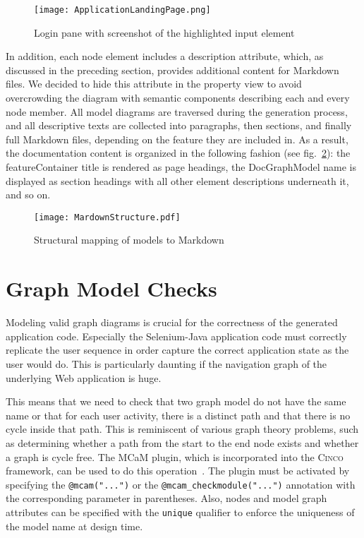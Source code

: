 \begin{figure}[h]
    \centering
    \texttt{[image: ApplicationLandingPage.png]}
    \caption{Login pane with screenshot of the highlighted input element}
    \label{fig:screenshot}
\end{figure}

In addition, each node element includes a description attribute, which, as discussed in the preceding section, provides additional content for Markdown files. We decided to hide this attribute in the property view to avoid overcrowding the diagram with semantic components describing each and every node member. All model diagrams are traversed during the generation process, and all descriptive texts are collected into paragraphs, then sections, and finally full Markdown files, depending on the feature they are included in. As a result, the documentation content is organized in the following fashion (see fig.~\ref{fig:markdown}): the featureContainer title is rendered as page headings, the DocGraphModel name is displayed as section headings with all other element descriptions underneath it, and so on.

\begin{figure}[h]
    \centering
    \texttt{[image: MardownStructure.pdf]}
    \caption{Structural mapping of models to Markdown}
    \label{fig:markdown}
\end{figure}

\section{Graph Model Checks}\label{sec:modCheck}

Modeling valid graph diagrams is crucial for the correctness of the generated application code. Especially the Selenium-Java application code must correctly replicate the user sequence in order capture the correct application state as the user would do. This is particularly daunting if the navigation graph of the underlying Web application is huge.

This means that we need to check that two graph model do not have the same name or that for each user activity, there is a distinct path and that there is no cycle inside that path.  This is reminiscent of various graph theory problems, such as determining whether a path from the start to the end node exists and whether a graph is cycle free. The MCaM plugin, which is incorporated into the \textsc{Cinco} framework, can be used to do this operation~\cite{gitlabcinco}. The plugin must be activated by specifying the \lstinline{@mcam("...")} or the \lstinline{@mcam_checkmodule("...")} annotation with the corresponding parameter in parentheses. Also, nodes and model graph attributes can be specified with the \lstinline[language=MGL]{unique} qualifier to enforce the uniqueness of the model name at design time.

